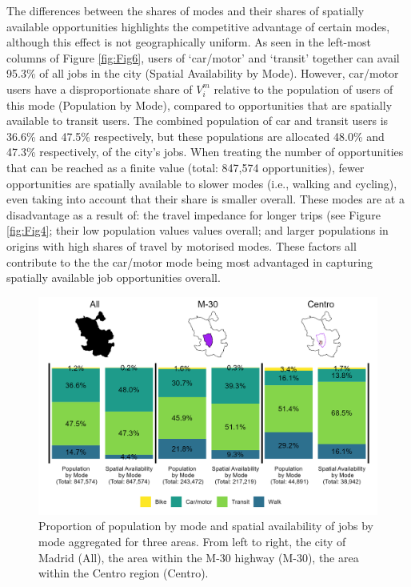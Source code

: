 \documentclass[10pt,letterpaper]{article}
\begin{document}
The differences between the shares of modes and their shares of
spatially available opportunities highlights the competitive advantage
of certain modes, although this effect is not geographically uniform. As
seen in the left-most columns of Figure \ref{fig:Fig6}, users of
`car/motor' and `transit' together can avail 95.3\% of all jobs in the
city (Spatial Availability by Mode). However, car/motor users have a
disproportionate share of \(V_i^m\) relative to the population of users
of this mode (Population by Mode), compared to opportunities that are
spatially available to transit users. The combined population of car and
transit users is 36.6\% and 47.5\% respectively, but these populations
are allocated 48.0\% and 47.3\% respectively, of the city's jobs. When
treating the number of opportunities that can be reached as a finite
value (total: 847,574 opportunities), fewer opportunities are spatially
available to slower modes (i.e., walking and cycling), even taking into
account that their share is smaller overall. These modes are at a
disadvantage as a result of: the travel impedance for longer trips (see
Figure \ref{fig:Fig4}; their low population values values overall; and
larger populations in origins with high shares of travel by motorised
modes. These factors all contribute to the the car/motor mode being most
advantaged in capturing spatially available job opportunities overall.

\begin{figure}

{\centering \includegraphics[width=0.85\linewidth]{images/Fig6} 

}

\caption{\label{fig:Fig6} Proportion of population by mode and spatial availability of jobs by mode aggregated for three areas. From left to right, the city of Madrid (All), the area within the M-30 highway (M-30), the area within the Centro region (Centro).}\label{fig:modal-V-comps-plot}
\end{figure}
\end{document}
